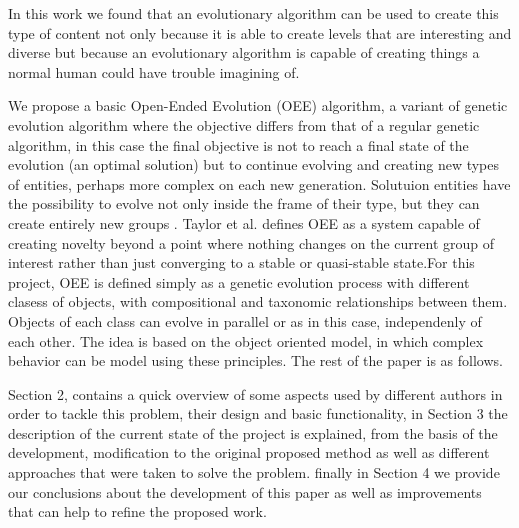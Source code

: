 \documentclass[conference]{IEEEtran}
\begin{document}
In this work we found that an evolutionary algorithm can be used to create 
this type of content not only because it is able to create levels that are interesting 
and diverse but because an evolutionary algorithm is capable of creating things a 
normal human could have trouble imagining of.



We propose a basic Open-Ended Evolution (OEE) algorithm, a variant of genetic
evolution algorithm where the objective differs from that of a regular genetic
algorithm,  in this case the final objective is not to reach a final state of
the evolution (an optimal solution) but to continue evolving and creating new
types of entities, perhaps more complex on each new generation. Solutuion
entities have the possibility to evolve not only inside the frame of their type,
but  they can create entirely new groups \cite{Standish2003}. Taylor et al.
\cite{Taylor2016,Taylor} defines OEE as a system capable of creating novelty
beyond a point where nothing changes on the current group of interest rather
than just converging to a stable or quasi-stable state.For this project, OEE is
defined simply as a genetic evolution process with different clasess of objects,
with compositional and taxonomic relationships between them. Objects of each
class can evolve in parallel or as in this case, independenly of each other. The
idea is based on the object oriented model, in which complex behavior can be
model using these principles. The rest of the paper is as follows.


Section 2, contains a quick overview of some aspects used by different authors
in order to tackle this problem, their design and basic functionality, in
Section 3 the description of the current state of the project is explained, from
the basis of the development, modification to the original proposed method as 
well as different approaches that were taken to solve the problem.
finally in Section 4 we provide our conclusions about the development of this
paper as well as improvements that can help to refine the proposed work. 
\end{document}
